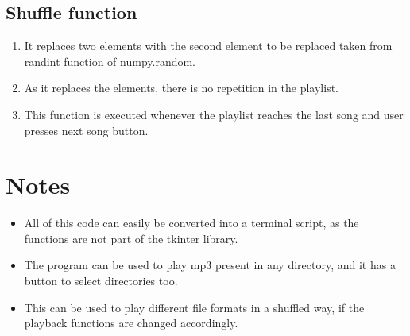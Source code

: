 \documentclass{article}
\begin{document}
\subsection*{Shuffle function}
\begin{enumerate}
    \item It replaces two elements with the second element to be replaced taken from randint function of numpy.random.
    \item As it replaces the elements, there is no repetition in the playlist.
    \item This function is executed whenever the playlist reaches the last song and user presses next song button.
\end{enumerate}

\section{Notes}
\begin{itemize}
    \item All of this code can easily be converted into a terminal script, as the functions are not part of the tkinter library.
    \item The program can be used to play mp3 present in any directory, and it has a button to select directories too.
    \item This can be used to play different file formats in a shuffled way, if the playback functions are changed accordingly.
\end{itemize}

 
\end{document}
